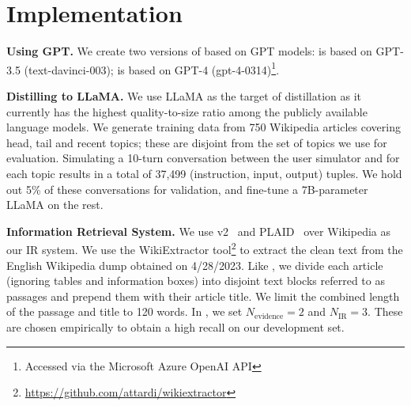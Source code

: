 \section{Implementation}
\label{sec:experiment}

{\bf \system Using GPT.}
We create two versions of \system based on GPT models: \systemgt is based on GPT-3.5 (text-davinci-003); \systemgf is based on GPT-4 (gpt-4-0314)\footnote{Accessed via the Microsoft Azure OpenAI API}.

{\bf Distilling \system to LLaMA.}
We use LLaMA as the target of distillation as it currently has the highest quality-to-size ratio among the publicly available language models.
We generate training data from 750 Wikipedia articles covering head, tail and recent topics; these are disjoint from the set of topics we use for evaluation. 
Simulating a 10-turn conversation between the user simulator and \systemgf for each topic results in a total of 37,499 (instruction, input, output) tuples.
We hold out 5\% of these conversations for validation, and fine-tune a 7B-parameter LLaMA on the rest. 

{\bf Information Retrieval System.}
We use \colbert v2~\cite{santhanam-etal-2022-colbertv2} and PLAID~\cite{plaid2022} over Wikipedia as our IR system. 
We use the WikiExtractor tool\footnote{\url{https://github.com/attardi/wikiextractor}} to extract the clean text from the English Wikipedia dump obtained on 4/28/2023. Like \colbert, we divide each article (ignoring tables and information boxes) into disjoint text blocks referred to as passages and prepend them with their article title. We limit the combined length of the passage and title to 120 words. In \system, we set $N_{\text{evidence}}=2$ and $N_{\text{IR}}=3$. These are chosen empirically to obtain a high recall on our development set.


